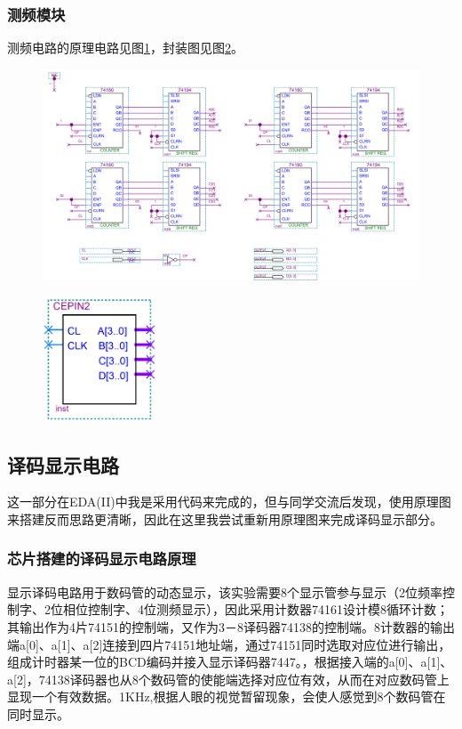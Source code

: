 \documentclass[12pt]{article}
\begin{document}
\subsubsection{测频模块}
测频电路的原理电路见图\ref{fig:cepin}，封装图见图\ref{fig:fengzhuangcepin}。
\begin{figure}[hp]
	\centering  
	\includegraphics[width=\textwidth]{picture/cepin.png} 
	\caption{}
	\label{fig:cepin}   
\end{figure}
\begin{figure}[hp]
	\centering  
	\includegraphics[width=0.3\textwidth]{picture/cepinfz.png} 
	\caption{}
	\label{fig:fengzhuangcepin}   
\end{figure}
\subsection{译码显示电路}
这一部分在EDA(II)中我是采用代码来完成的，但与同学交流后发现，使用原理图来搭建反而思路更清晰，因此在这里我尝试重新用原理图来完成译码显示部分。
\subsubsection{芯片搭建的译码显示电路原理}
显示译码电路用于数码管的动态显示，该实验需要8个显示管参与显示（2位频率控制字、2位相位控制字、4位测频显示），因此采用计数器74161设计模8循环计数；其输出作为4片74151的控制端，又作为3－8译码器74138的控制端。8计数器的输出端a[0]、a[1]、a[2]连接到四片74151地址端，通过74151同时选取对应位进行输出，组成计时器某一位的BCD编码并接入显示译码器7447。，根据接入端的a[0]、a[1]、a[2]，74138译码器也从8个数码管的使能端选择对应位有效，从而在对应数码管上显现一个有效数据。1KHz,根据人眼的视觉暂留现象，会使人感觉到8个数码管在同时显示。
\end{document}
